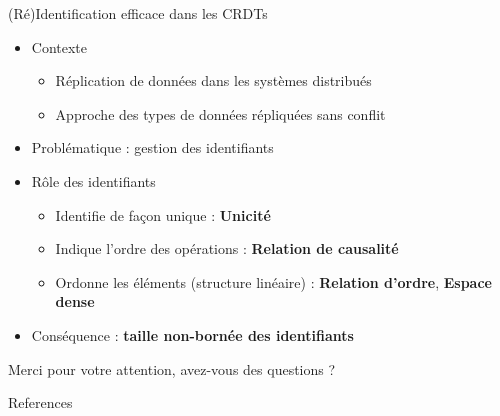 \documentclass[10pt]{beamer}
\begin{document}

\begin{frame}{(Ré)Identification efficace dans les CRDTs}
  \begin{itemize}
    \item Contexte
    \begin{itemize}
      \item Réplication de données dans les systèmes distribués
      \item Approche des types de données répliquées sans conflit \cite{ShapiroSSS2011}
    \end{itemize}

    \item Problématique : gestion des identifiants

    \item Rôle des identifiants
    \begin{itemize}
      \item Identifie de façon unique : \textbf{Unicité}
      \item Indique l'ordre des opérations : \textbf{Relation de causalité}
      \item Ordonne les éléments (structure linéaire) : \textbf{Relation d'ordre}, \textbf{Espace dense}
    \end{itemize}

    \item Conséquence : \textbf{taille non-bornée des identifiants}
  \end{itemize}
\end{frame}

\begin{frame}[standout]
  Merci pour votre attention, avez-vous des questions ?
\end{frame}

\begin{frame}[allowframebreaks]{References}
	
	
\end{frame}
\end{document}
